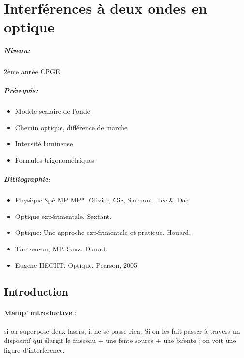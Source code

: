 \documentclass[11pt]{report}
\numberwithin{figure}{section}
\numberwithin{equation}{section}
\numberwithin{table}{section}
\newcommand{\1}{\boldsymbol{1}}
\begin{document}

\chapter{Interférences à deux ondes en optique}


\paragraph*{Niveau:} 2ème année CPGE

\paragraph*{Prérequis:}
\begin{itemize}
\item Modèle scalaire de l'onde
\item Chemin optique, différence de marche
\item Intensité lumineuse
\item Formules trigonométriques
\end{itemize}

\paragraph*{Bibliographie:}
\begin{itemize}
\item Physique Spé MP-MP*. Olivier, Gié, Sarmant. Tec \& Doc
\item Optique expérimentale. Sextant.
\item Optique: Une approche expérimentale et pratique. Houard.
\item Tout-en-un, MP. Sanz. Dunod.
\item Eugene HECHT. Optique. Pearson, 2005
\end{itemize}

\section*{Introduction}


\subsubsection*{Manip' introductive :} si on superpose deux lasers, il ne se passe rien. Si on les fait passer à travers un dispositif qui élargit le faisceau + une fente source + une bifente : on voit une figure d'interférence.
\end{document}
